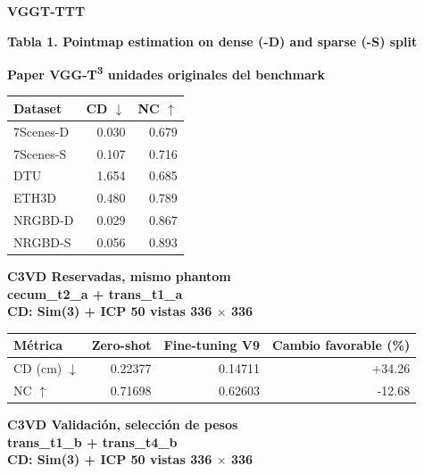 \documentclass[10pt,a4paper]{article}
\begin{document}
{\Large\bfseries\color{header} VGGT-TTT}\par
\vspace{5mm}
{\large\bfseries Tabla 1. Pointmap estimation on dense (-D) and sparse (-S) split}\par
\vspace{4mm}
{\small\bfseries Paper \textperiodcentered{} VGG-T\textsuperscript{3} \textperiodcentered{} unidades originales del benchmark}\par
\vspace{2mm}
\begingroup\small
\begin{tabularx}{\textwidth}{@{}LRR@{}}
\toprule
\textbf{Dataset} & \textbf{CD \(\downarrow\)} & \textbf{NC \(\uparrow\)} \\
\midrule
7Scenes-D & 0.030 & 0.679 \\
7Scenes-S & 0.107 & 0.716 \\
DTU & 1.654 & 0.685 \\
ETH3D & 0.480 & 0.789 \\
NRGBD-D & 0.029 & 0.867 \\
NRGBD-S & 0.056 & 0.893 \\
\bottomrule
\end{tabularx}
\endgroup
\vspace{6mm}
{\small\bfseries C3VD \textperiodcentered{} Reservadas, mismo phantom\\cecum\_t2\_a + trans\_t1\_a\\CD: Sim(3) + ICP \textperiodcentered{} 50 vistas \textperiodcentered{} 336 \(\times\) 336}\par
\vspace{2mm}
\begingroup\small
\begin{tabularx}{\textwidth}{@{}LRRR@{}}
\toprule
\textbf{Métrica} & \textbf{Zero-shot} & \textbf{Fine-tuning V9} & \textbf{Cambio favorable (\%)} \\
\midrule
CD (cm) \(\downarrow\) & 0.22377 & 0.14711 & +34.26 \\
NC \(\uparrow\) & 0.71698 & 0.62603 & -12.68 \\
\bottomrule
\end{tabularx}
\endgroup
\vspace{6mm}
{\small\bfseries C3VD \textperiodcentered{} Validación, selección de pesos\\trans\_t1\_b + trans\_t4\_b\\CD: Sim(3) + ICP \textperiodcentered{} 50 vistas \textperiodcentered{} 336 \(\times\) 336}\par
\vspace{2mm}
\end{document}
